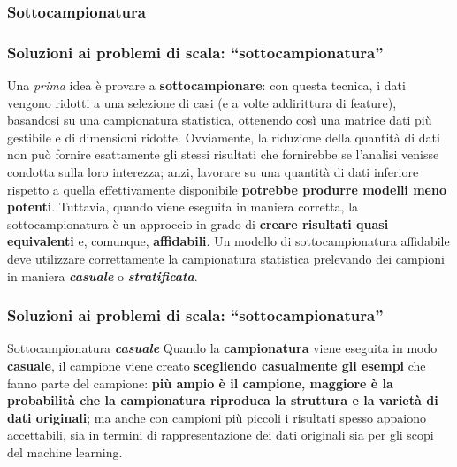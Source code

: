 \subsubsection[Sottocampionatura]{Sottocampionatura}
\begin{frame}
	
	\frametitle{Soluzioni ai problemi di scala: {\color{GradientDescentDiagramBlue}``sottocampionatura''}}
	
		Una \textit{prima} idea è provare a \textbf{sottocampionare}: con questa tecnica, i dati vengono ridotti a una selezione di casi (e a volte addirittura di feature), basandosi su una campionatura statistica, ottenendo così una matrice dati più gestibile e di dimensioni ridotte.
		\newlinedouble
		Ovviamente, la riduzione della quantità di dati non può fornire esattamente gli stessi risultati che fornirebbe se l’analisi venisse condotta sulla loro interezza; anzi, lavorare su una quantità di dati inferiore rispetto a quella effettivamente disponibile \textbf{potrebbe produrre modelli meno potenti}.
		\newlinedouble
		Tuttavia, quando viene eseguita in maniera corretta, la sottocampionatura è un approccio in grado di \textbf{creare risultati quasi equivalenti} e, comunque, \textbf{affidabili}. Un modello di sottocampionatura affidabile deve utilizzare correttamente la campionatura statistica prelevando dei campioni in maniera \textit{\textbf{casuale}} o \textit{\textbf{stratificata}}.
		

\end{frame}



\begin{frame}
	
	\frametitle{Soluzioni ai problemi di scala: {\color{GradientDescentDiagramBlue}``sottocampionatura''}}
	
	\begin{block}{Sottocampionatura \textit{\textbf{casuale}}}
		Quando la \textbf{campionatura} viene eseguita in modo \textbf{casuale}, il campione viene creato \textbf{scegliendo casualmente gli esempi} che fanno parte del campione: \textbf{più ampio è il campione, maggiore è la probabilità che la campionatura riproduca la struttura e la varietà di dati originali}; ma anche con campioni più piccoli i risultati spesso appaiono accettabili, sia in termini di rappresentazione dei dati originali sia per gli scopi del machine learning.		
	\end{block}

\end{frame}


